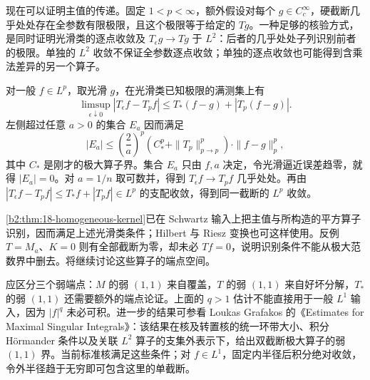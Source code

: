 现在可以证明主值的传递。固定 \(1<p<\infty\)，额外假设对每个 \(g\in C_c^\infty\)，硬截断几乎处处存在全参数有限极限，且这个极限等于给定的 \(Tg\)。一种足够的核验方式，是同时证明光滑类的逐点收敛及 \(T_\epsilon g\to Tg\) 于 \(L^2\)：后者的几乎处处子列识别前者的极限。单独的 \(L^2\) 收敛不保证全参数逐点收敛；单独的逐点收敛也可能得到含乘法差异的另一个算子。

\ProseParagraphBreak

对一般 \(f\in L^p\)，取光滑 \(g\)，在光滑类已知极限的满测集上有
\begin{equation}\label{b2:eq:18-principal-value-transfer}
 \limsup_{\epsilon\downarrow0}|T_\epsilon f-T_pf|
 \leq T_*(f-g)+|T_p(f-g)|.
\end{equation}
左侧超过任意 \(a>0\) 的集合 \(E_a\) 因而满足
\[
 |E_a|\leq\left(\frac2a\right)^p
        \left(C_*^p+\|T_p\|_{p\to p}^p\right)\cdot\|f-g\|_p^p,
\]
其中 \(C_*\) 是刚才的极大算子界。集合 \(E_a\) 只由 \(f,a\) 决定，令光滑逼近误差趋零，就得 \(|E_a|=0\)。对 \(a=1/n\) 取可数并，得到 \(T_\epsilon f\to T_pf\) 几乎处处。再由
\(|T_\epsilon f-T_pf|\leq T_*f+|T_pf|\in L^p\)
的支配收敛，得到同一截断的 \(L^p\) 收敛。

\ProseParagraphBreak

\cref{b2:thm:18-homogeneous-kernel}已在 Schwartz 输入上把主值与所构造的平方算子识别，因而满足上述光滑类条件；Hilbert 与 Riesz 变换也可这样使用。反例 \(T=M_a\)、\(K=0\) 则有全部截断为零，却未必 \(Tf=0\)，说明识别条件不能从极大范数界中删去。将继续讨论这些算子的端点空间。

\ProseParagraphBreak

应区分三个弱端点：\(M\) 的弱 \((1,1)\) 来自覆盖，\(T\) 的弱 \((1,1)\) 来自好坏分解，\(T_*\) 的弱 \((1,1)\) 还需要额外的端点论证。上面的 \(q>1\) 估计不能直接用于一般 \(L^1\) 输入，因为 \(|f|^q\) 未必可积。进一步的结果可参看 Loukas Grafakos 的《Estimates for Maximal Singular Integrals》\cite[Theorem 1]{Grafakos2003Maximal}：该结果在核及转置核的统一环带大小、积分 Hörmander 条件以及关联 \(L^2\) 算子的支集外表示下，给出双截断极大算子的弱 \((1,1)\) 界。当前标准核满足这些条件；对 \(f\in L^1\)，固定内半径后积分绝对收敛，令外半径趋于无穷即可包含这里的单截断。

\ProseParagraphBreak

